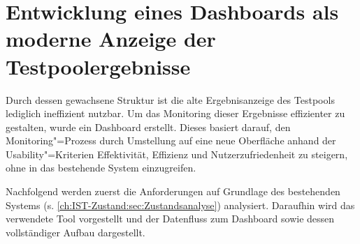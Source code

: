 \chapter{Entwicklung eines Dashboards als moderne Anzeige der Testpoolergebnisse} %
\label{ch:Erstellung Dashboard}

Durch dessen gewachsene Struktur ist die alte Ergebnisanzeige des Testpools lediglich ineffizient nutzbar.
Um das Monitoring dieser Ergebnisse effizienter zu gestalten, wurde ein Dash\-board erstellt. Dieses basiert darauf, den Monitoring"=Prozess durch Umstellung auf eine neue Oberfläche anhand der Usability"=Kriterien Effektivität, Effizienz und Nutzerzufriedenheit zu steigern, ohne in das bestehende System einzugreifen.

Nachfolgend werden zuerst die Anforderungen auf Grundlage des bestehenden Systems (s. \autoref{ch:IST-Zustand:sec:Zustandsanalyse}) analysiert. Daraufhin wird das verwendete Tool vorgestellt und der Datenfluss zum Dash\-board sowie dessen vollständiger Aufbau dargestellt.







